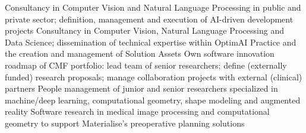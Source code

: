 \documentclass[
	a4paper,
	sidesectionsize=Large,
	maincolor=cvprimary,
	sectioncolor=cvprimary,
	sidecolor=cvprimary!10,
	topbottommargin=0.02\paperheight,
	leftrightmargin=0.02\paperwidth,
	profilepiczoom=1.2,
	profilepicxshift=2mm,
	profilepicyshift=-4mm,
	profilepicrounding=0.5cm,
]{fortysecondscv}
\begin{document}
\makefrontsidebar
\newlength{\firstpagespacing}
\setlength{\firstpagespacing}{2ex}

\vspace{\firstpagespacing}
\vspace*{-1ex}
\begin{cvtable}[3.5]
	{Consultancy in Computer Vision and Natural Language Processing in public and private sector; definition, management and execution of AI-driven development projects}
	{Consultancy in Computer Vision, Natural Language Processing and Data Science; dissemination of technical expertise within OptimAI Practice and the creation and management of Solution Assets}
	{Own software innovation roadmap of CMF portfolio: lead team of senior researchers; define (externally funded) research proposals; manage collaboration projects with external (clinical) partners}
	{People management of junior and senior researchers specialized in machine/deep learning, computational geometry, shape modeling and augmented reality}
	{Software research in medical image processing and computational geometry to support Materialise's preoperative planning solutions}
\end{cvtable}
\end{document}
